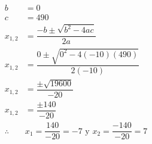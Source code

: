 {\begin{solutionbox}{10.5cm}
\begin{multicols}{2}
\[\begin{array}{rl}
                    b          & =0                                                            \\
                    c          & =490                                                          \\
                    x_{1,2}    & = \dfrac{-b\pm\sqrt{b^2-4ac}}{2a}                             \\[2em]
                    x_{1,2}    & = \dfrac{0\pm\sqrt{0^2-4(-10)(490)}}{2(-10)}                  \\[2em]
                    x_{1,2}    & = \dfrac{\pm\sqrt{19600}}{-20}                                \\[2em]
                    x_{1,2}    & = \dfrac{\pm140}{-20}                                         \\[2em]
                    \therefore & x_1 =\dfrac{140}{-20}=-7 \text{ y }  x_2 =\dfrac{-140}{-20}=7 \\[2em]
                \end{array}
            \]
        \end{multicols}
    \end{solutionbox}
}